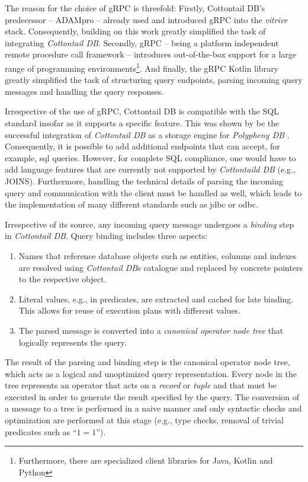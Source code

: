 The reason for the choice of gRPC is threefold: Firstly, Cottontail DB's predecessor -- ADAMpro -- already used and introduced gRPC into the \emph{vitrivr} stack. Consequently, building on this work greatly simplified the task of integrating \emph{Cottontail DB}. Secondly, gRPC -- being a platform independent remote procedure call framework -- introduces out-of-the-box support for a large range of programming environments\footnote{Furthermore, there are specialized client libraries for Java, Kotlin and Python}. And finally, the gRPC Kotlin library greatly simplified the task of structuring query endpoints, parsing incoming query messages and handling the query responses.

Irrespective of the use of gRPC, Cottontail DB is compatible with the SQL standard insofar as it supports a specific feature. This was shown by be the successful integration of \emph{Cottontail DB} as a storage engine for \emph{Polypheny DB} . Consequently, it is possible to add additional endpoints that can accept, for example, \acrshort{sql} queries. However, for complete SQL compliance, one would have to add language features that are currently not supported by \emph{Cottontaild DB} (e.g., JOINS). Furthermore, handling the technical details of parsing the incoming query and communication with the client must be handled as well, which leads to the implementation of many different standards such as \acrshort{jdbc} or \acrshort{odbc}.

Irrespective of its source, any incoming query message undergoes a \emph{binding} step in \emph{Cottontail DB}. Query binding includes three aspects:

\begin{enumerate}
    \item Names that reference database objects such as entities, columns and indexes are resolved using \emph{Cottontail DB}s catalogue and replaced by concrete pointers to the respective object.
    \item Literal values, e.g., in predicates, are extracted and cached for late binding. This allows for reuse of execution plans with different values.
    \item The parsed message is converted into a \emph{canonical operator node tree} that logically represents the query.
\end{enumerate}

The result of the parsing and binding step is the canonical operator node tree, which acts as a logical and unoptimized query representation.  Every node in the tree represents an operator that acts on a \emph{record} or \emph{tuple} and that must be executed in order to generate the result specified by the query. The conversion of a message to a tree is performed in a naive manner and only syntactic checks and optimization are performed at this stage (e.g., type checks, removal of trivial predicates such as ``$1 = 1$'').

